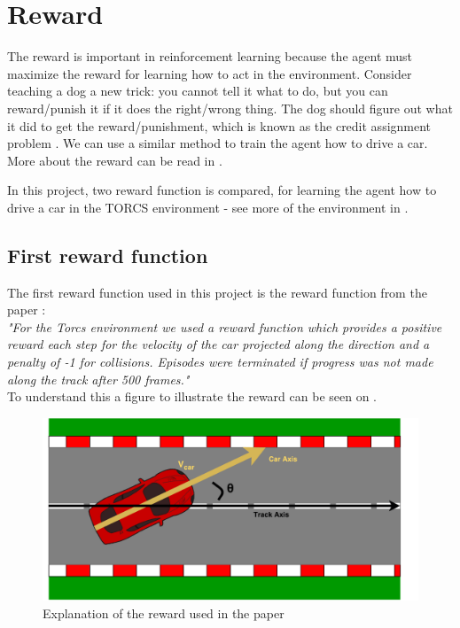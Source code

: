 \section{Reward}\label{sectionReward}
The reward is important in reinforcement learning because the agent must maximize the reward for learning how to act in the environment. Consider teaching a dog a new trick: you cannot tell it what to do, but you can reward/punish it if it does the right/wrong thing. The dog should figure out what it did to get the reward/punishment, which is known as the credit assignment problem \cite{reward_small}. We can use a similar method to train the agent how to drive a car. More about the reward can be read in .  

In this project, two reward function is compared, for learning the agent how to drive a car in the TORCS environment - see more of the environment in .  
\newpage
\subsection*{First reward function}
The first reward function used in this project is the reward function from the paper \cite{DBLP:journals/corr/LillicrapHPHETS15}: \\
\textit{"For the Torcs environment we used a reward function which provides a positive reward each step for the velocity of the car projected along the direction and a penalty of -1 for collisions. Episodes were terminated if progress was not made along the track after 500 frames."}\\
To understand this a figure to illustrate the reward can be seen on .

\begin{figure}[H]
	\centering
	\includegraphics[width=1\textwidth]{Figures/Result/Reward_paper.pdf}
	\caption{Explanation of the reward used in the paper \cite{DBLP:journals/corr/LillicrapHPHETS15} }
	\label{fig:Reward_paper}
\end{figure}

